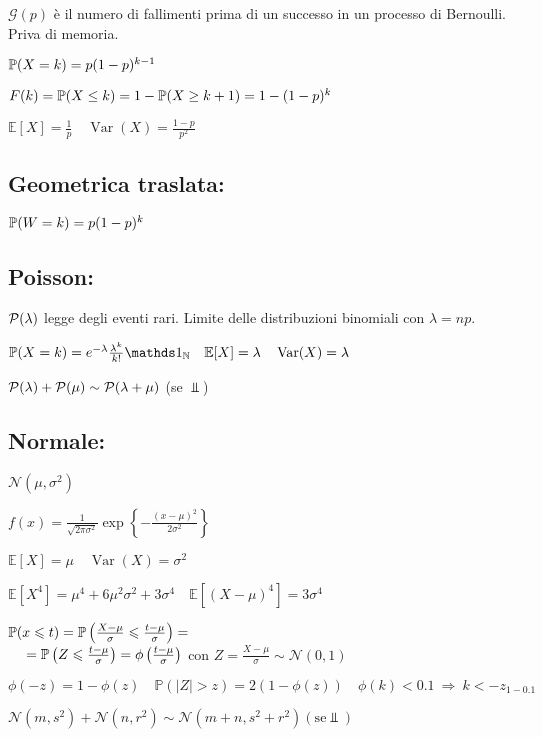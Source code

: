 $\mathcal{G}(p)$ è il numero di fallimenti prima di un successo in un processo di Bernoulli. Priva di memoria.

$\mathbb{P}(X=k)=p(1-p)^{k-1}$

$F(k)=\mathbb{P}(X \leq k)=1-\mathbb{P}(X \geq k+1)=1-(1-p)^{k}$

$\mathbb{E}[X]=\frac{1}{p} \quad \operatorname{Var}(X)=\frac{1-p}{p^{2}}$

\subsection{Geometrica traslata:} 

$\mathbb{P}(W=k)=p(1-p)^{k}$

\subsection{Poisson:}

$\mathcal{P}(\lambda)$ legge degli eventi rari. Limite delle distribuzioni binomiali con $\lambda=n p$.

$\PP(X=k)=e^{-\lambda} \frac{\lambda^{k}}{k !}\Ind_\NN \quad \mathbb{E}[X]=\lambda \quad \operatorname{Var}(X)=\lambda$

$\mathcal{P}(\lambda)+\mathcal{P}(\mu)\sim\mathcal{P}(\lambda+\mu)$ (se $\Perp$)

\subsection{Normale:} 

$\mathcal{N}\left(\mu, \sigma^{2}\right)$

$f(x)=\frac{1}{\sqrt{2 \pi \sigma^{2}}} \exp \left\{-\frac{(x-\mu)^{2}}{2 \sigma^{2}}\right\}$

$\mathbb{E}[X]=\mu \quad \operatorname{Var}(X)=\sigma^{2}$

$\mathbb{E}\left[X^{4}\right]=\mu^{4}+6 \mu^{2} \sigma^{2}+3 \sigma^{4} \quad \mathbb{E}\left[(X-\mu)^{4}\right]=3 \sigma^{4}$

$\mathbb{P}(x \leqslant t)=\mathbb{P}\left(\frac{X-\mu}{\sigma} \leqslant \frac{t-\mu}{\sigma}\right)=$ \\
$\text{}\quad=\mathbb{P}\left(Z\leqslant \frac{t-\mu}{\sigma}\right)=\phi\left(\frac{t-\mu}{\sigma}\right)$ con $Z=\frac{X-\mu}{\sigma} \sim \mathcal{N}(0,1)$

$\phi(-z)=1-\phi(z) \quad \mathbb{P}(|Z|>z)=2(1-\phi(z)) \quad \phi(k)<0.1\ \Rightarrow\ k<-z_{1-0.1}$

$\mathcal{N}\left(m, s^{2}\right)+\mathcal{N}\left(n, r^{2}\right)\sim\mathcal{N}\left(m+n, s^{2}+r^{2}\right)(\mathrm{se} \Perp)$

